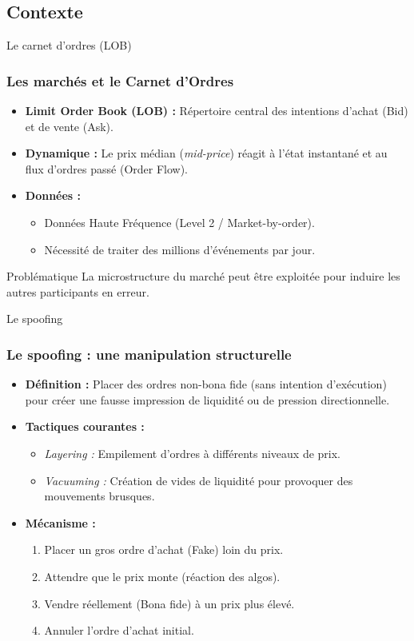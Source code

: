 \documentclass{beamer}
\begin{document}
\subsection{Contexte}
\begin{frame}{Le carnet d'ordres (LOB)}
    \frametitle{Les marchés et le Carnet d'Ordres}
    \begin{itemize}
        \item \textbf{Limit Order Book (LOB) :} Répertoire central des intentions d'achat (Bid) et de vente (Ask).
        \item \textbf{Dynamique :} Le prix médian (\textit{mid-price}) réagit à l'état instantané et au flux d'ordres passé (Order Flow).
        \item \textbf{Données :} 
        \begin{itemize}
            \item Données Haute Fréquence (Level 2 / Market-by-order).
            \item Nécessité de traiter des millions d'événements par jour.
        \end{itemize}
    \end{itemize}
    \begin{block}{Problématique}
        La microstructure du marché peut être exploitée pour induire les autres participants en erreur.
    \end{block}
\end{frame}

\begin{frame}{Le spoofing}
    \frametitle{Le spoofing : une manipulation structurelle}
    \begin{itemize}
        \item \textbf{Définition :} Placer des ordres non-bona fide (sans intention d'exécution) pour créer une fausse impression de liquidité ou de pression directionnelle.
        \item \textbf{Tactiques courantes :}
        \begin{itemize}
            \item \textit{Layering :} Empilement d'ordres à différents niveaux de prix.
            \item \textit{Vacuuming :} Création de vides de liquidité pour provoquer des mouvements brusques.
        \end{itemize}
        \item \textbf{Mécanisme :} 
        \begin{enumerate}
            \item Placer un gros ordre d'achat (Fake) loin du prix.
            \item Attendre que le prix monte (réaction des algos).
            \item Vendre réellement (Bona fide) à un prix plus élevé.
            \item Annuler l'ordre d'achat initial.
        \end{enumerate}
    \end{itemize}
\end{frame}
\end{document}
